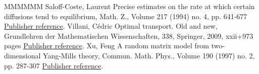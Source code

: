 \begin{thebibliography}{MMMMMM}
 Saloff-Coste, Laurent Precise estimates on the rate at which certain diffusions tend to equilibrium, Math. Z., Volume 217 (1994) no. 4, pp. 641-677 \href{https://ahl.centre-mersenne.org/item/AHL_2018__1__247_0/#SC1994b}{Publisher reference}.
 Villani, Cédric Optimal transport. Old and new, Grundlehren der Mathematischen Wissenschaften, 338, Springer, 2009, xxii+973 pages \href{https://ahl.centre-mersenne.org/item/AHL_2018__1__247_0/#Vil}{Publisher reference}.
 Xu, Feng A random matrix model from two-dimensional Yang-Mills theory, Commun. Math. Phys., Volume 190 (1997) no. 2, pp. 287-307 \href{https://ahl.centre-mersenne.org/item/AHL_2018__1__247_0/#Xu1997}{Publisher reference}.
\end{thebibliography}
